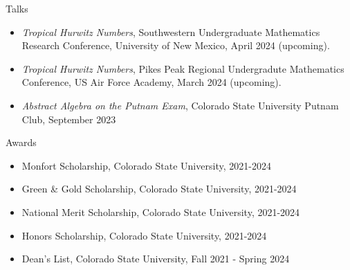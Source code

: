 \documentclass[
	11pt, %
]{resume} %
\begin{document}

\begin{rSection}{Talks}

	\begin{itemize}
		\item{\textit{Tropical Hurwitz Numbers}, Southwestern Undergraduate Mathematics Research Conference, University of New Mexico, April 2024 (upcoming).}
		\item{\textit{Tropical Hurwitz Numbers}, Pikes Peak Regional Undergradute Mathematics Conference, US Air Force Academy, March 2024 (upcoming).}
		\item{\textit{Abstract Algebra on the Putnam Exam}, Colorado State University Putnam Club, September 2023}
	\end{itemize}
	
\end{rSection}


\begin{rSection}{Awards} %


	\begin{itemize}
		\item{Monfort Scholarship, Colorado State University, 2021-2024}
		\item{Green \& Gold Scholarship, Colorado State University, 2021-2024}
		\item{National Merit Scholarship, Colorado State University, 2021-2024}
		\item{Honors Scholarship, Colorado State University, 2021-2024}
		\item{Dean's List, Colorado State University, Fall 2021 - Spring 2024}
	\end{itemize}
	
\end{rSection}
\end{document}
